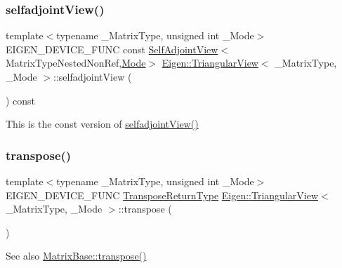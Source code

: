 \subsubsection{\texorpdfstring{selfadjointView()}{selfadjointView()}\hspace{0.1cm}{\footnotesize\ttfamily [2/2]}}
{\footnotesize\ttfamily template$<$typename \+\_\+\+Matrix\+Type, unsigned int \+\_\+\+Mode$>$ \\
E\+I\+G\+E\+N\+\_\+\+D\+E\+V\+I\+C\+E\+\_\+\+F\+U\+NC const \mbox{\hyperlink{class_eigen_1_1_self_adjoint_view}{Self\+Adjoint\+View}}$<$Matrix\+Type\+Nested\+Non\+Ref,\mbox{\hyperlink{struct_mode}{Mode}}$>$ \mbox{\hyperlink{class_eigen_1_1_triangular_view}{Eigen\+::\+Triangular\+View}}$<$ \+\_\+\+Matrix\+Type, \+\_\+\+Mode $>$\+::selfadjoint\+View (\begin{DoxyParamCaption}{ }\end{DoxyParamCaption}) const\hspace{0.3cm}{\ttfamily [inline]}}

This is the const version of \mbox{\hyperlink{class_eigen_1_1_triangular_view_a1fe2e5e93164b2efb5124297b096fb10}{selfadjoint\+View()}} \mbox{\label{class_eigen_1_1_triangular_view_a5336b45208d7e351aba7536aef153075}} 
\subsubsection{\texorpdfstring{transpose()}{transpose()}\hspace{0.1cm}{\footnotesize\ttfamily [1/2]}}
{\footnotesize\ttfamily template$<$typename \+\_\+\+Matrix\+Type, unsigned int \+\_\+\+Mode$>$ \\
E\+I\+G\+E\+N\+\_\+\+D\+E\+V\+I\+C\+E\+\_\+\+F\+U\+NC \mbox{\hyperlink{class_eigen_1_1_triangular_view}{Transpose\+Return\+Type}} \mbox{\hyperlink{class_eigen_1_1_triangular_view}{Eigen\+::\+Triangular\+View}}$<$ \+\_\+\+Matrix\+Type, \+\_\+\+Mode $>$\+::transpose (\begin{DoxyParamCaption}{ }\end{DoxyParamCaption})\hspace{0.3cm}{\ttfamily [inline]}}

\begin{DoxySeeAlso}{See also}
\mbox{\hyperlink{class_eigen_1_1_dense_base_ac8952c19644a4ac7e41bea45c19b909c}{Matrix\+Base\+::transpose()}} 
\end{DoxySeeAlso}
\mbox{\label{class_eigen_1_1_triangular_view_a202b574fc82f1433989c3ae35128451e}} 

